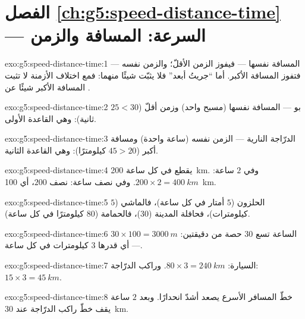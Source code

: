 \section*{الفصل \ref{ch:g5:speed-distance-time} --- السرعة: المسافة والزمن}

\begin{solution}{exo:g5:speed-distance-time:1}
المسافة نفسها --- فيفوز الزمن الأقلّ؛ والزمن نفسه --- فتفوز
المسافة الأكبر. أما ``جريتُ أبعد'' فلا يثبّت شيئًا منهما: فمع
اختلاف الأزمنة لا تثبت المسافة الأكبر شيئًا عن .
\end{solution}

\begin{solution}{exo:g5:speed-distance-time:2}
بو --- المسافة نفسها (مسبح واحد) وزمن أقلّ ($25 < 30$ ثانية):
وهي القاعدة الأولى.
\end{solution}

\begin{solution}{exo:g5:speed-distance-time:3}
الدرّاجة النارية --- الزمن نفسه (ساعة واحدة) ومسافة أكبر
($45 > 20$ كيلومترًا): وهي القاعدة الثانية.
\end{solution}

\begin{solution}{exo:g5:speed-distance-time:4}
يقطع في كل ساعة \qty{200}{km}. وفي $2$ ساعة: $200 \times 2
= \qty{400}{km}$. وفي نصف ساعة: نصف $200$، أي \qty{100}{km}.
\end{solution}

\begin{solution}{exo:g5:speed-distance-time:5}
الحلزون ($5$ أمتار في كل ساعة)، فالماشي ($5$ كيلومترات)، فحافلة
المدينة ($30$)، فالحمامة ($80$ كيلومترًا في كل ساعة).
\end{solution}

\begin{solution}{exo:g5:speed-distance-time:6}
الساعة تسع $30$ حصة من دقيقتين: $30 \times 100 =
\qty{3000}{m}$ --- أي  قدرها $3$ كيلومترات في كل ساعة.
\end{solution}

\begin{solution}{exo:g5:speed-distance-time:7}
السيارة: $80 \times 3 = \qty{240}{km}$. وراكب الدرّاجة:
$15 \times 3 = \qty{45}{km}$.
\end{solution}

\begin{solution}{exo:g5:speed-distance-time:8}
خطّ المسافر الأسرع يصعد أشدّ انحدارًا. وبعد $2$ ساعة يقف خطّ
راكب الدرّاجة عند \qty{30}{km}.
\end{solution}

